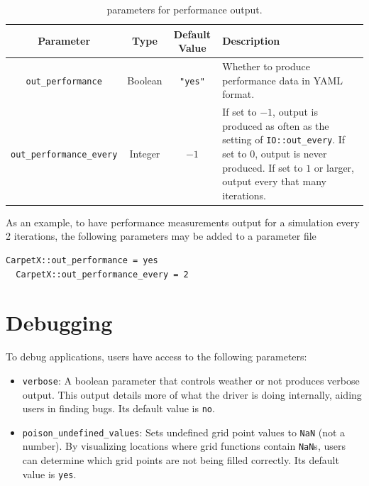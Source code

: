 \begin{table}[ht]
  \centering
  \begin{tabularx}{\textwidth}{cccX}
    Parameter                       & Type     & Default Value  & Description \\\hline\hline
    \texttt{out\_performance}        & Boolean & \texttt{"yes"} & Whether to produce performance data in YAML format. \\
    \texttt{out\_performance\_every} & Integer & $-1$           & If set to $-1$, output is produced as often as the setting of \texttt{IO::out\_every}. If set to $0$, output is never produced. If set to $1$ or larger, output every that many iterations. \\\hline\hline
  \end{tabularx}
  \label{tab:perf_output}
  \caption{\CarpetX\space parameters for performance output.}
\end{table}

As an example, to  have performance measurements output for a simulation every 2 iterations, the following parameters may be added to a parameter file

\begin{lstlisting}[language=bash]
  CarpetX::out_performance = yes  
  CarpetX::out_performance_every = 2
\end{lstlisting}

\section{Debugging}
\label{sec:debugging}

To debug \CarpetX\space applications, users have access to the following parameters: 
%
\begin{itemize}
    \item \texttt{verbose}: A boolean parameter that controls weather or not \CarpetX\space produces verbose output. This output details more of what the driver is doing internally, aiding users in finding bugs. Its default value is \texttt{no}.

    \item \texttt{poison\_undefined\_values}: Sets undefined grid point values to \texttt{NaN} (not a number). By visualizing locations where grid functions contain \texttt{NaN}s, users can determine which grid points are not being filled correctly. Its default value is \texttt{yes}.
\end{itemize}





